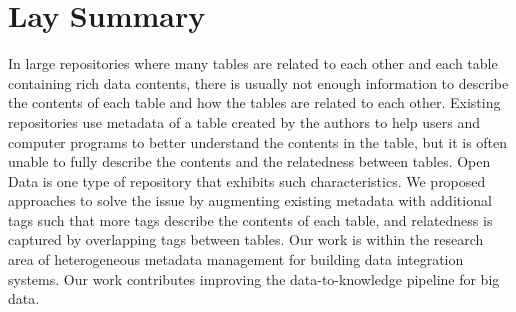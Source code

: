 

\chapter{Lay Summary}

In large repositories where many tables are related to each other and each table containing rich data contents, there is usually not enough information to describe the contents of each table and how the tables are related to each other. Existing repositories use metadata of a table created by the authors to help users and computer programs to better understand the contents in the table, but it is often unable to fully describe the contents and the relatedness between tables. Open Data is one type of repository that exhibits such characteristics. We proposed approaches to solve the issue by augmenting existing metadata with additional tags such that more tags describe the contents of each table, and relatedness is captured by overlapping tags between tables. Our work is within the research area of heterogeneous metadata management for building data integration systems. Our work contributes improving the data-to-knowledge pipeline for big data.
\endinput